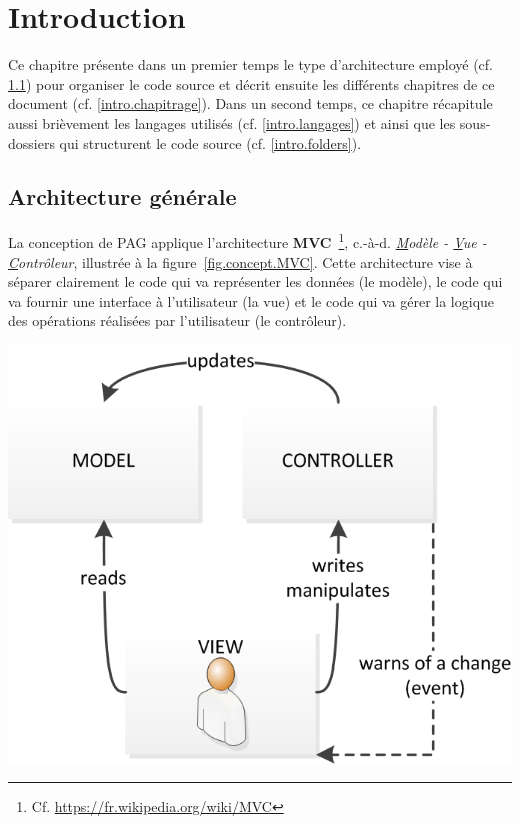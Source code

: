 \chapter{Introduction}\label{intro}

Ce chapitre présente dans un premier temps le type d'architecture employé (cf. \ref{intro.archi}) 
pour organiser le code source et décrit ensuite les différents chapitres de ce document 
(cf. \ref{intro.chapitrage}). Dans un second temps, ce chapitre récapitule aussi brièvement les 
langages utilisés (cf. \ref{intro.langages}) et ainsi que les sous-dossiers qui structurent le 
code source (cf. \ref{intro.folders}).

\section{Architecture générale}\label{intro.archi}

La conception de PAG applique l'architecture 
\textbf{MVC}~\footnote{Cf. \url{https://fr.wikipedia.org/wiki/MVC}}, 
c.-à-d. \textit{\underline{M}odèle - \underline{V}ue - \underline{C}ontrôleur}, illustrée à 
la figure~\ref{fig.concept.MVC}. Cette architecture 
vise à séparer clairement le code qui va représenter les données (le modèle), le code qui va 
fournir une interface à l'utilisateur (la vue) et le code qui va gérer la logique des opérations 
réalisées par l'utilisateur (le contrôleur).

\vspace{-0.2cm}
\begin{center}
    \includegraphics[scale=1.0]{figures/ModeleMVC.png}
	\label{fig.concept.MVC}
\end{center}
\vspace{-0.2cm}


